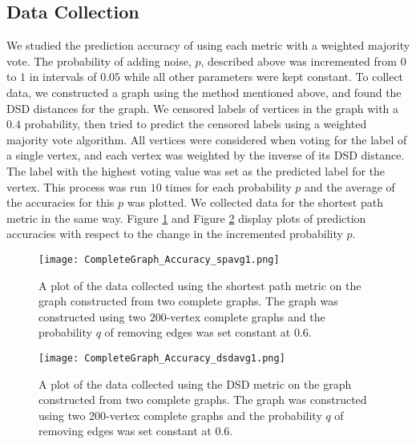 \subsection{Data Collection}
We studied the prediction accuracy of using each metric with a weighted majority vote. The probability of adding noise, $p$, described above was incremented from $0$ to $1$ in intervals of $0.05$ while all other parameters were kept constant. To collect data, we constructed a graph using the method mentioned above, and found the DSD distances for the graph. We censored labels of vertices in the graph with a $0.4$ probability, then tried to predict the censored labels using a weighted majority vote algorithm. All vertices were considered when voting for the label of a single vertex, and each vertex was weighted by the inverse of its DSD distance. The label with the highest voting value was set as the predicted label for the vertex. This process was run $10$ times for each probability $p$ and the average of the accuracies for this $p$ was plotted. We collected data for the shortest path metric in the same way. Figure \ref{fig:complete_graph_plot_shortest_path} and Figure \ref{fig:complete_graph_plot_dsd} display plots of prediction accuracies with respect to the change in the incremented probability $p$.

\begin{figure}[h]
\centering
\texttt{[image: CompleteGraph\_Accuracy\_spavg1.png]}
\caption{A plot of the data collected using the shortest path metric on the graph constructed from two complete graphs. The graph was constructed using two 200-vertex complete graphs and the probability $q$ of removing edges was set constant at $0.6$.}
\label{fig:complete_graph_plot_shortest_path}
\end{figure}

\begin{figure}[h]
\centering
\texttt{[image: CompleteGraph\_Accuracy\_dsdavg1.png]}
\caption{A plot of the data collected using the DSD metric on the graph constructed from two complete graphs. The graph was constructed using two 200-vertex complete graphs and the probability $q$ of removing edges was set constant at $0.6$.}
\label{fig:complete_graph_plot_dsd}
\end{figure}

